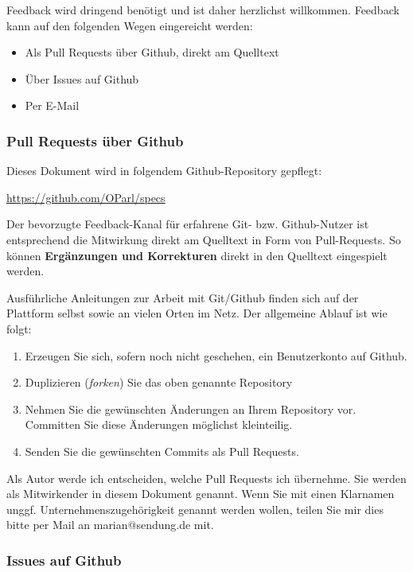 \documentclass[,a4paper]{article}
\begin{document}
Feedback wird dringend benötigt und ist daher herzlichst willkommen.
Feedback kann auf den folgenden Wegen eingereicht werden:

\begin{itemize}
\item
  Als Pull Requests über Github, direkt am Quelltext
\item
  Über Issues auf Github
\item
  Per E-Mail
\end{itemize}

\subsubsection{Pull Requests über Github}

Dieses Dokument wird in folgendem Github-Repository gepflegt:

\href{https://github.com/OParl/specs}{https://github.com/OParl/specs}

Der bevorzugte Feedback-Kanal für erfahrene Git- bzw. Github-Nutzer ist
entsprechend die Mitwirkung direkt am Quelltext in Form von
Pull-Requests. So können \textbf{Ergänzungen und Korrekturen} direkt in
den Quelltext eingespielt werden.

Ausführliche Anleitungen zur Arbeit mit Git/Github finden sich auf der
Plattform selbst sowie an vielen Orten im Netz. Der allgemeine Ablauf
ist wie folgt:

\begin{enumerate}[1.]
\item
  Erzeugen Sie sich, sofern noch nicht geschehen, ein Benutzerkonto auf
  Github.
\item
  Duplizieren (\emph{forken}) Sie das oben genannte Repository
\item
  Nehmen Sie die gewünschten Änderungen an Ihrem Repository vor.
  Committen Sie diese Änderungen möglichst kleinteilig.
\item
  Senden Sie die gewünschten Commits als Pull Requests.
\end{enumerate}

Als Autor werde ich entscheiden, welche Pull Requests ich übernehme. Sie
werden als Mitwirkender in diesem Dokument genannt. Wenn Sie mit einen
Klarnamen unggf. Unternehmenszugehörigkeit genannt werden wollen, teilen
Sie mir dies bitte per Mail an marian@sendung.de mit.

\subsubsection{Issues auf Github}
\end{document}
